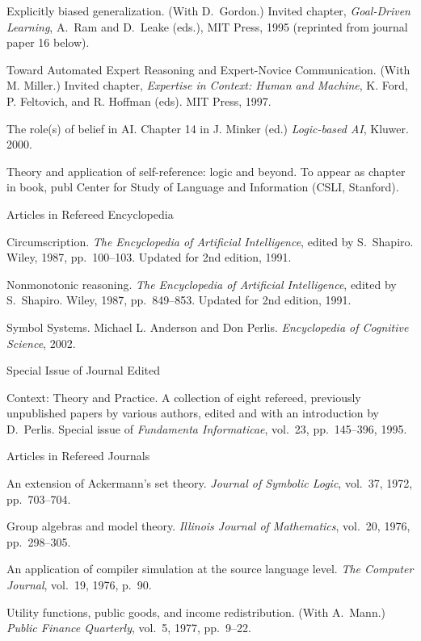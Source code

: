 \paper
Explicitly biased generalization.
(With D.~Gordon.) Invited chapter,
{\sl Goal-Driven Learning}, A.~Ram and D.~Leake (eds.),
MIT Press, 1995
(reprinted from journal paper 16 below).

\paper
Toward Automated Expert Reasoning and Expert-Novice Communication.  (With
M. Miller.)  Invited chapter, {\sl Expertise in
Context: Human and Machine}, K. Ford, P. Feltovich, and R. Hoffman
(eds). MIT Press, 1997.

\paper
The role(s) of belief in AI.  Chapter 14 in
J. Minker (ed.) {\sl Logic-based AI}, Kluwer. 2000.

\paper
Theory and application of self-reference: logic and beyond.
To appear as chapter in book, publ Center for Study of Language and
Information (CSLI, Stanford).


\subsec Articles in Refereed Encyclopedia

\paper
Circumscription.
{\sl The Encyclopedia of Artificial Intelligence}, edited
by S.~Shapiro. Wiley, 1987, pp.~100--103. Updated for 2nd edition, 1991.

\paper
Nonmonotonic reasoning.
{\sl The Encyclopedia of Artificial Intelligence}, edited
by S.~Shapiro. Wiley, 1987, pp.~849--853. Updated for 2nd edition,
1991.

\paper Symbol Systems. Michael L. Anderson and Don
Perlis.  {\sl Encyclopedia of Cognitive Science}, 2002.

\subsec Special Issue of Journal Edited

\paper
Context: Theory and Practice. A collection of eight refereed, previously
unpublished papers by various authors, edited and
with an introduction by D.~Perlis. Special issue of {\sl Fundamenta
Informaticae}, vol.~23, pp.~145--396, 1995.

\subsec Articles in Refereed Journals

\paper
An extension of Ackermann's set theory.
{\sl Journal of Symbolic Logic}, 
vol.~37, 1972, pp.~703--704.

\paper
Group algebras and model theory.
{\sl Illinois Journal of Mathematics}, 
vol.~20, 1976, pp.~298--305.

\paper
An application of compiler simulation at the source language level.
{\sl The Computer Journal}, 
vol.~19, 1976, p.~90.

\paper
Utility functions, public goods, and income redistribution.
(With A.~Mann.)
{\sl Public Finance Quarterly}, 
vol.~5, 1977, pp.~9--22.

